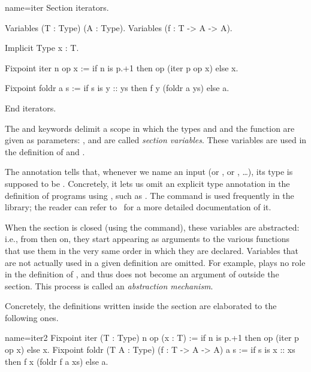 \begin{coq}{name=iter}{}
Section iterators.

Variables (T : Type) (A : Type).
Variables (f : T -> A -> A).

Implicit Type x : T.

Fixpoint iter n op x :=
  if n is p.+1 then op (iter p op x) else x.

Fixpoint foldr a s :=
  if s is y :: ys then f y (foldr a ys) else a.

End iterators.
\end{coq}
The  and  keywords delimit a scope in which
the types  and  and the function  are given as
parameters: ,  and  are called \emph{section
  variables}.  These variables
are used in the definition of  and .

The  annotation
tells \Coq{} that, whenever we name
an input  (or , or , \ldots), its type is supposed to be
.  Concretely, it lets us omit an explicit type annotation
in the definition of programs using , such as .
The   command is used frequently in the
\mcbMC{} library; the reader can refer to~\cite[section 4.2, ``Extensions of Gallina'']{Coq:manual}
for a more detailed documentation of it.

When
the section is closed (using the  command), these variables
are abstracted: i.e., from then on, they start appearing as arguments
to the various functions that use them in the very same
order in which they are declared.
Variables that are not actually used
in a given definition are omitted. For example,  plays no
role in the definition of , and thus does not become an
argument of  outside the section.
This process %
is called
an {\em abstraction mechanism}.

Concretely, the definitions written inside the section are
elaborated to the following ones.

\begin{coq}{name=iter2}{}
Fixpoint iter (T : Type) n op (x : T) :=
  if n is p.+1 then op (iter p op x) else x.
Fixpoint foldr (T A : Type) (f : T -> A -> A) a s :=
  if s is x :: xs then f x (foldr f a xs) else a.
\end{coq}

